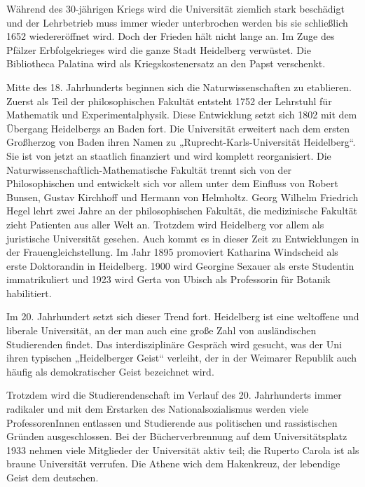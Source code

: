 Während des 30-jährigen Kriegs wird die Universität ziemlich stark beschädigt und der Lehrbetrieb muss immer wieder unterbrochen werden bis sie schließlich 1652 wiedereröffnet wird. Doch der Frieden hält nicht lange an. Im Zuge des Pfälzer Erbfolgekrieges wird die ganze Stadt Heidelberg verwüstet. Die Bibliotheca Palatina wird als Kriegskostenersatz an den Papst verschenkt. 


Mitte des 18. Jahrhunderts beginnen sich die Naturwissenschaften zu etablieren. Zuerst als Teil der philosophischen Fakultät entsteht 1752 der Lehrstuhl für Mathematik und Experimentalphysik. Diese Entwicklung setzt sich 1802 mit dem Übergang Heidelbergs an Baden fort. Die Universität erweitert nach dem ersten Großherzog von Baden ihren Namen zu „Ruprecht-Karls-Universität Heidelberg“. Sie ist von jetzt an staatlich finanziert und wird komplett reorganisiert. Die Naturwissenschaftlich-Mathematische Fakultät trennt sich von der Philosophischen und entwickelt sich vor allem unter dem Einfluss von Robert Bunsen, Gustav Kirchhoff und Hermann von Helmholtz. Georg Wilhelm Friedrich Hegel lehrt zwei Jahre an der philosophischen Fakultät, die medizinische Fakultät zieht Patienten aus aller Welt an. Trotzdem wird Heidelberg vor allem als juristische Universität gesehen. Auch kommt es in dieser Zeit zu Entwicklungen in der Frauengleichstellung. Im Jahr 1895 promoviert Katharina Windscheid als erste Doktorandin in Heidelberg. 1900 wird Georgine Sexauer als erste Studentin immatrikuliert und 1923 wird Gerta von Ubisch als Professorin für Botanik habilitiert.

Im 20. Jahrhundert setzt sich dieser Trend fort. Heidelberg ist eine weltoffene und liberale Universität, an der man auch eine große Zahl von ausländischen Studierenden findet. Das interdisziplinäre Gespräch wird gesucht, was der Uni ihren typischen „Heidelberger Geist“ verleiht, der in der Weimarer Republik auch häufig als demokratischer Geist bezeichnet wird.

Trotzdem wird die Studierendenschaft im Verlauf des 20. Jahrhunderts immer radikaler und mit dem Erstarken des Nationalsozialismus werden viele ProfessorenInnen entlassen und Studierende aus politischen und rassistischen Gründen ausgeschlossen. Bei der Bücherverbrennung auf dem Universitätsplatz 1933 nehmen viele Mitglieder der Universität aktiv teil; die Ruperto Carola ist als braune Universität verrufen. Die Athene wich dem Hakenkreuz, der lebendige Geist dem deutschen. 

